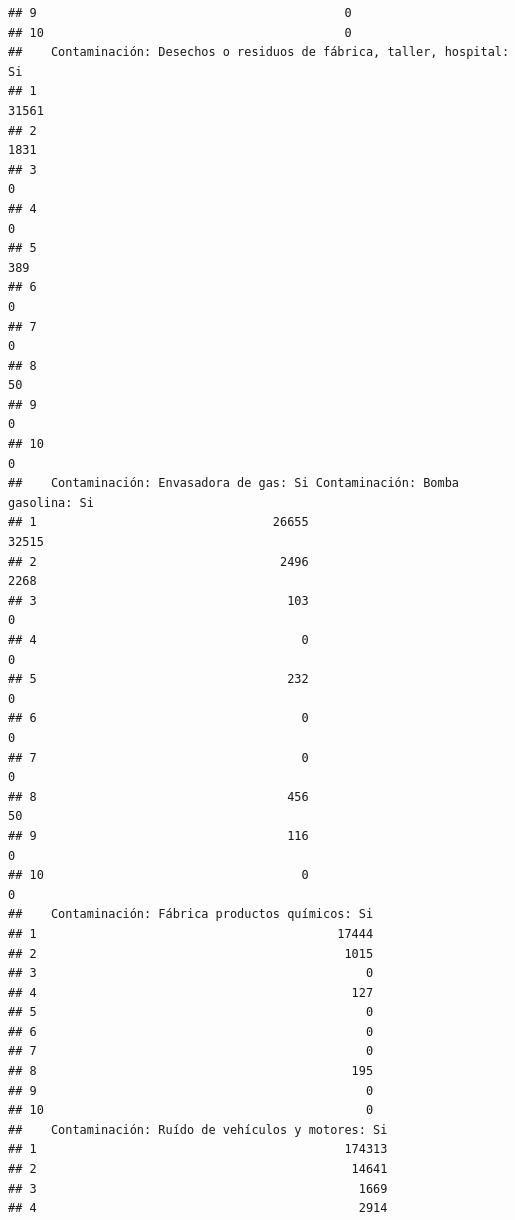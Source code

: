 \documentclass[11pt,]{article}
\begin{document}
\begin{verbatim}
## 9                                           0
## 10                                          0
##    Contaminación: Desechos o residuos de fábrica, taller, hospital: Si
## 1                                                                31561
## 2                                                                 1831
## 3                                                                    0
## 4                                                                    0
## 5                                                                  389
## 6                                                                    0
## 7                                                                    0
## 8                                                                   50
## 9                                                                    0
## 10                                                                   0
##    Contaminación: Envasadora de gas: Si Contaminación: Bomba gasolina: Si
## 1                                 26655                             32515
## 2                                  2496                              2268
## 3                                   103                                 0
## 4                                     0                                 0
## 5                                   232                                 0
## 6                                     0                                 0
## 7                                     0                                 0
## 8                                   456                                50
## 9                                   116                                 0
## 10                                    0                                 0
##    Contaminación: Fábrica productos químicos: Si
## 1                                          17444
## 2                                           1015
## 3                                              0
## 4                                            127
## 5                                              0
## 6                                              0
## 7                                              0
## 8                                            195
## 9                                              0
## 10                                             0
##    Contaminación: Ruído de vehículos y motores: Si
## 1                                           174313
## 2                                            14641
## 3                                             1669
## 4                                             2914

\end{verbatim}
\end{document}
